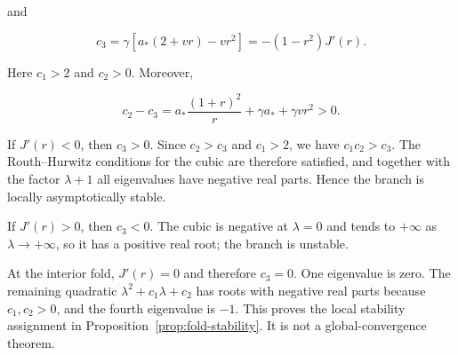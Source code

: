 \documentclass[11pt,a4paper]{article}
\begin{document}
and

\begin{equation}
c_3=\gamma\left[a_*(2+vr)-vr^2\right]
=-(1-r^2)J'(r).
\label{eq:c3}
\end{equation}

Here $c_1>2$ and $c_2>0$. Moreover,

\[
c_2-c_3
=
a_*\frac{(1+r)^2}{r}+\gamma a_*+\gamma vr^2>0.
\]

If $J'(r)<0$, then $c_3>0$. Since $c_2>c_3$ and $c_1>2$, we have $c_1c_2>c_3$. The Routh--Hurwitz conditions for the cubic are therefore satisfied, and together with the factor $\lambda+1$ all eigenvalues have negative real parts. Hence the branch is locally asymptotically stable.

If $J'(r)>0$, then $c_3<0$. The cubic is negative at $\lambda=0$ and tends to $+\infty$ as $\lambda\to+\infty$, so it has a positive real root; the branch is unstable.

At the interior fold, $J'(r)=0$ and therefore $c_3=0$. One eigenvalue is zero. The remaining quadratic $\lambda^2+c_1\lambda+c_2$ has roots with negative real parts because $c_1,c_2>0$, and the fourth eigenvalue is $-1$. This proves the local stability assignment in Proposition~\ref{prop:fold-stability}. It is not a global-convergence theorem.

\printbibliography
\end{document}
